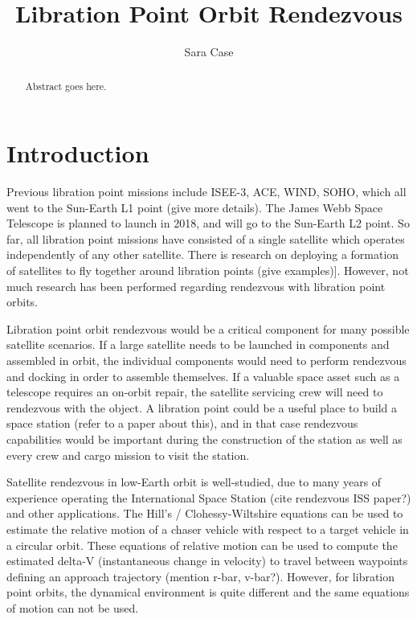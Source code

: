 \documentclass[]{article}
\title{Libration Point Orbit Rendezvous}
\author{Sara Case}
\begin{document}
\maketitle

\begin{abstract}
	
	Abstract goes here.

\end{abstract}

\section{Introduction}

Previous libration point missions include ISEE-3, ACE, WIND, SOHO, which all went to the Sun-Earth L1 point (give more details).  The James Webb Space Telescope is planned to launch in 2018, and will go to the Sun-Earth L2 point.  So far, all libration point missions have consisted of a single satellite which operates independently of any other satellite.  There is research on deploying a formation of satellites to fly together around libration points (give examples)].  However, not much research has been performed regarding rendezvous with libration point orbits.

Libration point orbit rendezvous would be a critical component for many possible satellite scenarios.  If a large satellite needs to be launched in components and assembled in orbit, the individual components would need to perform rendezvous and docking in order to assemble themselves.  If a valuable space asset such as a telescope requires an on-orbit repair, the satellite servicing crew will need to rendezvous with the object.  A libration point could be a useful place to build a space station (refer to a paper about this), and in that case rendezvous capabilities would be important during the construction of the station as well as every crew and cargo mission to visit the station.

Satellite rendezvous in low-Earth orbit is well-studied, due to many years of experience operating the International Space Station (cite rendezvous ISS paper?) and other applications.  The Hill's / Clohessy-Wiltshire equations can be used to estimate the relative motion of a chaser vehicle with respect to a target vehicle in a circular orbit.  These equations of relative motion can be used to compute the estimated delta-V (instantaneous change in velocity) to travel between waypoints defining an approach trajectory (mention r-bar, v-bar?).  However, for libration point orbits, the dynamical environment is quite different and the same equations of motion can not be used.
\end{document}
